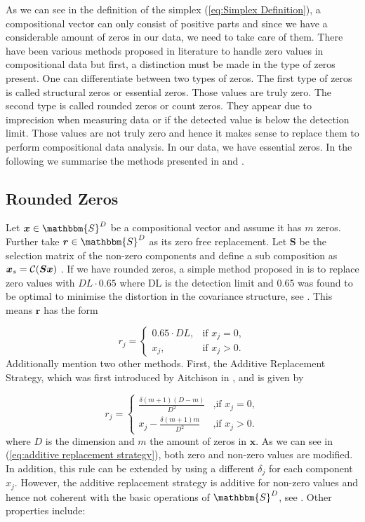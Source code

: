 As we can see in the definition of the simplex (\ref{eq:Simplex Definition}), a compositional vector can only consist of positive parts and since we have a considerable amount of zeros in our data, we need to take care of them. There have been various methods proposed in literature to handle zero values in compositional data but first, a distinction must be made in the type of zeros present. One can differentiate between two types of zeros. The first type of zeros is called structural zeros or essential zeros. Those values are truly zero. The second type is called rounded zeros or count zeros. They appear due to imprecision when measuring data or if the detected value is below the detection limit. Those values are not truly zero and hence it makes sense to replace them to perform compositional data analysis. In our data, we have essential zeros. In the following we summarise the methods presented in \textcite{Lubbe:2021} and \textcite{Josep:2003}. 

\subsection{Rounded Zeros}
\label{sec:Rounded Zeros}

Let $\bm{x} \in \mathbbm{S}^D$ be a compositional vector and assume it has $m$ zeros. Further take $\bm{r} \in \mathbbm{S}^D$ as its zero free replacement. Let $\bm{S}$ be the selection matrix of the non-zero components and define a sub composition as $\bm{x}_s=\mathcal{C}(\bm{Sx})$ . If we have rounded zeros, a simple method proposed in \textcite{Josep:2003} is to replace zero values with $DL \cdot 0.65$ where DL is the detection limit and 0.65 was found to be optimal to minimise the distortion in the covariance structure, see \textcite{Lubbe:2021}. This means $\bm{r}$ has the form

\begin{equation}
r_j = 
\begin{cases}
0.65\cdot DL, & \text{if } x_j=0, \\
x_j, & \text{if } x_j>0.
\end{cases}
\label{eq:DL065}
\end{equation}
%
Additionally \textcite{Josep:2003} mention two other methods. First, the Additive Replacement Strategy, which was first introduced by Aitchison in \textcite{Aitchison:1986}, and is given by

\begin{equation}
r_j = 
\begin{cases}
\frac{\delta(m+1)(D-m)}{D^2} & \text{,if } x_j=0, \\
x_j - \frac{\delta(m+1)m}{D^2} & \text{,if } x_j>0.
\end{cases}
\label{eq:additive replacement strategy}
\end{equation}
%
where $D$ is the dimension and $m$ the amount of zeros in $\bm{x}$. 
As we can see in (\ref{eq:additive replacement strategy}), both zero and non-zero values are modified. In addition, this rule can be extended by using a different $\delta_j$ for each component $x_j$. However, the additive replacement strategy is additive for non-zero values and hence not coherent with the basic operations of $\mathbbm{S}^D$, see \textcite{Josep:2003}. Other properties include:

